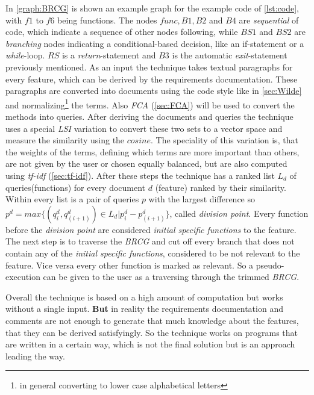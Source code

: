 In \autoref{graph:BRCG} is shown an example graph for the example code of \autoref{lst:code}, with $f1$ to $f6$ being functions. The nodes $func, B1, B2$ and $B4$ are \textit{sequential} of code, which indicate a sequence of other nodes following, while $BS1$ and $BS2$ are \textit{branching} nodes indicating a conditional-based decision, like an if-statement or a \textit{while}-loop. $RS$ is a \textit{return}-statement and $B3$ is the automatic \textit{exit}-statement previously mentioned.\newline
As an input the technique takes textual paragraphs for every feature, which can be derived by the requirements documentation. These paragraphs are converted into documents using the code style  like in \autoref{sec:Wilde} and normalizing\footnote{in general converting to lower case alphabetical letters} the terms. Also \textit{FCA} (\autoref{sec:FCA}) will be used to convert the methods into queries. \newline
After deriving the documents and queries the technique uses a special \textit{LSI} variation to convert these two sets to a vector space and measure the similarity using the $cosine$. The speciality of this variation is, that the weights of the terms, defining which terms are more important than others, are not given by the user or chosen equally balanced, but are also computed using \textit{tf-idf} (\autoref{sec:tf-idf}).\newline
After these steps the technique has a ranked list $L_d$ of queries(functions) for every document $d$ (feature) ranked by their similarity. Within every list is a pair of queries $p$ with the largest difference so $p^d = max\{ (q^d_i, q^d_{(i+1)}) \in L_d | p^d_i - p^d_{(i+1)} \}$, called \textit{division point}. Every function before the \textit{division point} are considered \textit{initial specific functions} to the feature. \newline
The next step is to traverse the \textit{BRCG} and cut off every branch that does not contain any of the \textit{initial specific functions}, considered to be not relevant to the feature. Vice versa every other function is marked as relevant. So a pseudo-execution can be given to the user as a traversing through the trimmed \textit{BRCG}.\newline

Overall the technique is based on a high amount of computation but works without a single input. \textbf{But} in reality the requirements documentation and comments are not enough to generate that much knowledge about the features, that they can be derived satisfyingly. So the technique works on programs that are written in a certain way, which is not the final solution but is an approach leading the way.




